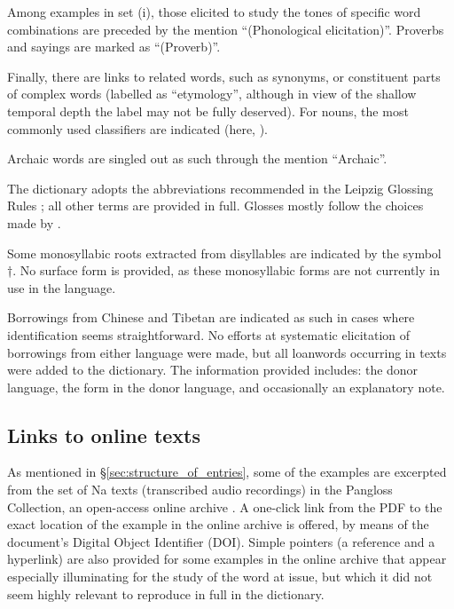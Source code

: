 Among examples in set (i), those elicited to study the tones of specific word combinations are preceded by the mention “(Phonological elicitation)”. Proverbs and sayings are marked as “(Proverb)”.

Finally, there are links to related words, such as synonyms, or constituent parts of complex words (labelled as “etymology”, although in view of the shallow temporal depth the label may not be fully deserved). For nouns, the most commonly used classifiers are indicated (here, ).

Archaic words are singled out as such through the mention “Archaic”.

The dictionary adopts the abbreviations recommended in the Leipzig Glossing Rules \parencite{comrieetal}; all other terms are provided in full. Glosses mostly follow the choices made by \textcite{lidz2010}.

Some monosyllabic roots extracted from disyllables are indicated by the symbol †. No surface form is provided, as these monosyllabic forms are not currently in use in the language.

Borrowings from Chinese and Tibetan are indicated as such in cases where identification seems straightforward. No efforts at systematic elicitation of borrowings from either language were made, but all loanwords occurring in texts were added to the dictionary. The information provided includes: the donor language, the form in the donor language, and occasionally an explanatory note. %



\subsection{Links to online texts}

As mentioned in §\ref{sec:structure_of_entries}, some of the examples are excerpted from the set of Na texts (transcribed audio recordings) in the Pangloss Collection, an open-access online archive \parencite[about which see ][]{michailovskyetal2014}. A one-click link from the PDF to the exact location of the example in the online archive is offered, by means of the document's Digital Object Identifier (DOI). Simple pointers (a reference and a hyperlink) are also provided for some examples in the online archive that appear especially illuminating for the study of the word at issue, but which it did not seem highly relevant to reproduce in full in the dictionary.

